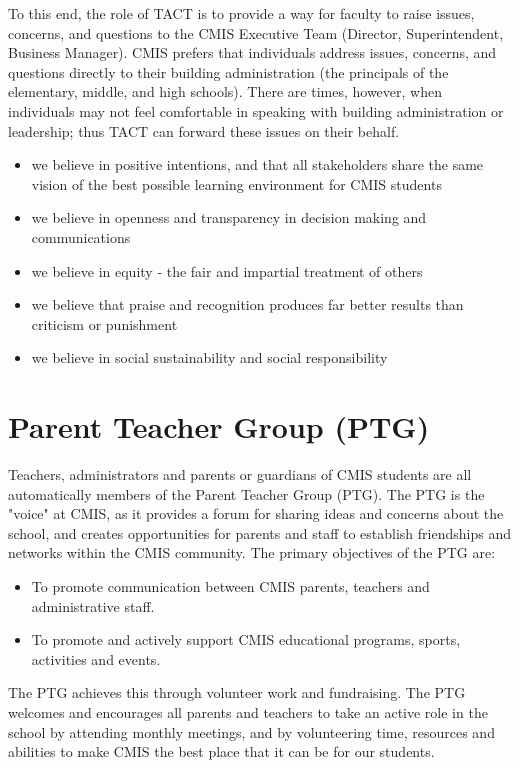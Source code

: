 To this end, the role of TACT is to provide a way for faculty to raise issues, concerns, and questions to the CMIS Executive Team (Director, Superintendent, Business Manager).  CMIS prefers that individuals address issues, concerns, and questions directly to their building administration (the principals of the elementary, middle, and high schools).  There are times, however, when individuals may not feel comfortable in speaking with building administration or leadership; thus TACT can forward these issues on their behalf.

\begin{itemize}
\item we believe in positive intentions, and that all stakeholders share the same vision of the best possible learning environment for CMIS students
\item we believe in openness and transparency in decision making and communications
\item we believe in equity - the fair and impartial treatment of others
\item we believe that praise and recognition produces far better results than criticism or punishment
\item we believe in social sustainability and social responsibility
\end{itemize}

\section{Parent Teacher Group (PTG)}

Teachers, administrators and parents or guardians of CMIS students are all automatically members of the Parent Teacher Group (PTG). The PTG is the "voice" at CMIS, as it provides a forum for sharing ideas and concerns about the school, and creates opportunities for parents and staff to establish friendships and networks within the CMIS community. The primary objectives of the PTG are:

\begin{itemize}
\item To promote communication between CMIS parents, teachers and administrative staff.
\item To promote and actively support CMIS educational programs, sports, activities and events.
\end{itemize}
 
The PTG achieves this through volunteer work and fundraising.  The PTG welcomes and encourages all parents and teachers to take an active role in the school by attending monthly meetings, and by volunteering time, resources and abilities to make CMIS the best place that it can be for our students.

